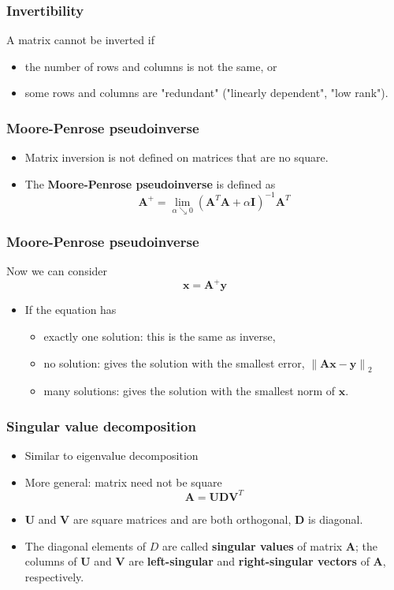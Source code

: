 \documentclass[notes]{beamer}          %
\newcommand{\vect}[1]{\bm{#1}}
\newcommand{\norm}[1]{\left\lVert#1\right\rVert}
\providecommand{\norm}[1]{\lVert#1\rVert}
\newif\iffull
\begin{document}
\begin{frame}
\frametitle{Invertibility}
    A matrix cannot be inverted if
    \begin{itemize}
        \item the number of rows and columns is not the same, or
        \item some rows and columns are "redundant" ("linearly dependent", "low rank").
    \end{itemize}
\end{frame}


\begin{frame}
\frametitle{Moore-Penrose pseudoinverse}
    \begin{itemize}
        \item Matrix inversion is not defined on matrices that are no square.
        \item The {\bf Moore-Penrose pseudoinverse} is defined as
        $$
        \vect{A}^{+} = \lim_{\alpha \searrow 0}(\vect{A}^T\vect{A}+\alpha \vect{I})^{-1}\vect{A}^T
        $$

    \end{itemize}
\end{frame}

\begin{frame}
\frametitle{Moore-Penrose pseudoinverse}
    Now we can consider
    $$\vect{x} = \vect{A}^{+} \vect{y}$$
    \begin{itemize}
        \item If the equation has
            \begin{itemize}
                \item exactly one solution: this is the same as inverse,
                \item no solution: gives the solution with the smallest error, $\norm{\vect{A}\vect{x} - \vect{y}}_2$
                \item many solutions: gives the solution with the smallest norm of $\vect{x}$.
            \end{itemize}
    \end{itemize}

\end{frame}

\iffull

\begin{frame}
\frametitle{Singular value decomposition}
    \begin{itemize}
        \item Similar to eigenvalue decomposition
        \item More general: matrix need not be square
        $$\vect{A} = \vect{U} \vect{D} \vect{V}^T$$
        \item $\vect{U}$ and $\vect{V}$ are square matrices and are both orthogonal, $\vect{D}$ is diagonal.
        \item The diagonal elements of $D$ are called {\bf singular values} of matrix $\vect{A}$; the columns of $\vect{U}$ and $\vect{V}$ are {\bf left-singular} and {\bf right-singular vectors} of $\vect{A}$, respectively.
    \end{itemize}

\end{frame}
\end{document}
